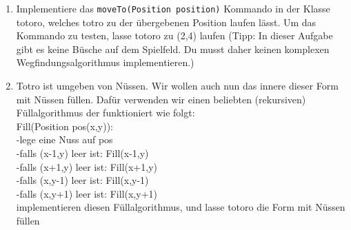 
\begin{enumerate}
\item Implementiere das \lstinline{moveTo(Position position)} Kommando in der Klasse totoro, welches totro zu der übergebenen Position laufen lässt. Um das Kommando zu testen, lasse totoro zu (2,4) laufen (Tipp: In dieser Aufgabe gibt es keine Büsche auf dem Spielfeld. Du musst daher keinen komplexen Wegfindungsalgorithmus implementieren.)
\item Totro ist umgeben von Nüssen. Wir wollen auch nun das innere dieser Form mit Nüssen füllen. Dafür verwenden wir einen beliebten (rekursiven) Füllalgorithmus der funktioniert wie folgt:\\
Fill(Position pos(x,y)):\\
-lege eine Nuss auf pos\\
-falls (x-1,y) leer ist: Fill(x-1,y)\\
-falls (x+1,y) leer ist: Fill(x+1,y)\\
-falls (x,y-1) leer ist: Fill(x,y-1)\\
-falls (x,y+1) leer ist: Fill(x,y+1)\\

implementieren diesen Füllalgorithmus, und lasse totoro die Form mit Nüssen füllen
\end{enumerate}
